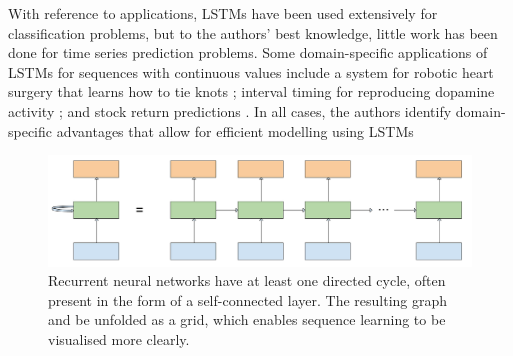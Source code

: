 \documentclass[pdftex,10pt,a4paper,journal]{article}
\theoremstyle{definition}
\theoremstyle{remark}
\begin{document}
\begin{multicols}{2}
\par With reference to applications, LSTMs have been used extensively for classification problems, but to the authors' best knowledge, little work has been done for time series prediction problems. Some domain-specific applications of LSTMs for sequences with continuous values include a system for robotic heart surgery that learns how to tie knots \cite{Mayer2008}; interval timing for reproducing dopamine activity \cite{Rivest2010}; and stock return predictions \cite{ZacharyC.Lipton2015}. In all cases, the authors identify domain-specific advantages that allow for efficient modelling using LSTMs

\begin{figure}[t]
    \centering
    \includegraphics[width=\textwidth]{figs/rnn.png}
    \caption{Recurrent neural networks have at least one directed cycle, often present in the form of a self-connected layer. The resulting graph and be unfolded as a grid, which enables sequence learning to be visualised more clearly.}
    \label{fig:rnn}
\end{figure}



\end{multicols}
\end{document}
